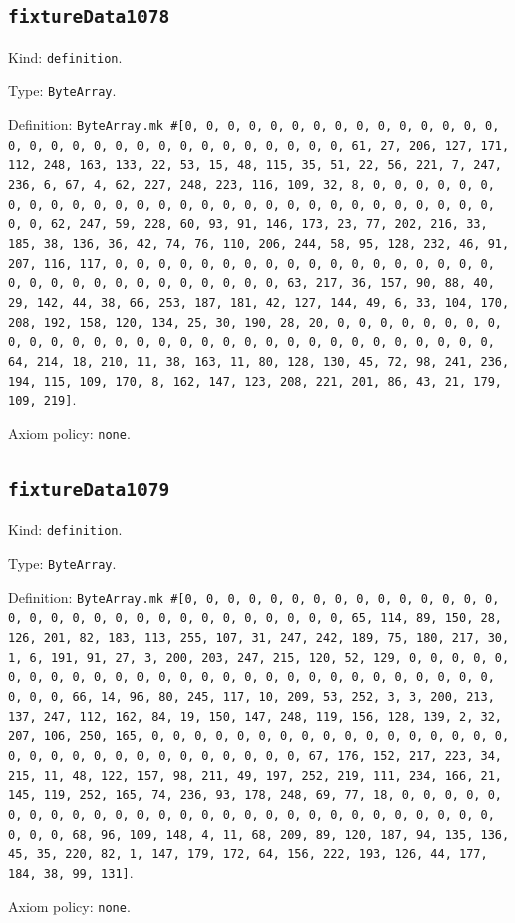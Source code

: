 \documentclass[11pt]{article}
\begin{document}
\subsection*{\texttt{fixtureData1078}}
\noindent Kind: \texttt{definition}.\par
\noindent Type: \texttt{ByteArray}.\par
\noindent Definition: \texttt{ByteArray.mk \#[0, 0, 0, 0, 0, 0, 0, 0, 0, 0, 0, 0, 0, 0, 0, 0, 0, 0, 0, 0, 0, 0, 0, 0, 0, 0, 0, 0, 0, 0, 0, 61, 27, 206, 127, 171, 112, 248, 163, 133, 22, 53, 15, 48, 115, 35, 51, 22, 56, 221, 7, 247, 236, 6, 67, 4, 62, 227, 248, 223, 116, 109, 32, 8, 0, 0, 0, 0, 0, 0, 0, 0, 0, 0, 0, 0, 0, 0, 0, 0, 0, 0, 0, 0, 0, 0, 0, 0, 0, 0, 0, 0, 0, 0, 0, 62, 247, 59, 228, 60, 93, 91, 146, 173, 23, 77, 202, 216, 33, 185, 38, 136, 36, 42, 74, 76, 110, 206, 244, 58, 95, 128, 232, 46, 91, 207, 116, 117, 0, 0, 0, 0, 0, 0, 0, 0, 0, 0, 0, 0, 0, 0, 0, 0, 0, 0, 0, 0, 0, 0, 0, 0, 0, 0, 0, 0, 0, 0, 0, 63, 217, 36, 157, 90, 88, 40, 29, 142, 44, 38, 66, 253, 187, 181, 42, 127, 144, 49, 6, 33, 104, 170, 208, 192, 158, 120, 134, 25, 30, 190, 28, 20, 0, 0, 0, 0, 0, 0, 0, 0, 0, 0, 0, 0, 0, 0, 0, 0, 0, 0, 0, 0, 0, 0, 0, 0, 0, 0, 0, 0, 0, 0, 0, 64, 214, 18, 210, 11, 38, 163, 11, 80, 128, 130, 45, 72, 98, 241, 236, 194, 115, 109, 170, 8, 162, 147, 123, 208, 221, 201, 86, 43, 21, 179, 109, 219]}.\par
\noindent Axiom policy: \texttt{none}.\par
\subsection*{\texttt{fixtureData1079}}
\noindent Kind: \texttt{definition}.\par
\noindent Type: \texttt{ByteArray}.\par
\noindent Definition: \texttt{ByteArray.mk \#[0, 0, 0, 0, 0, 0, 0, 0, 0, 0, 0, 0, 0, 0, 0, 0, 0, 0, 0, 0, 0, 0, 0, 0, 0, 0, 0, 0, 0, 0, 0, 65, 114, 89, 150, 28, 126, 201, 82, 183, 113, 255, 107, 31, 247, 242, 189, 75, 180, 217, 30, 1, 6, 191, 91, 27, 3, 200, 203, 247, 215, 120, 52, 129, 0, 0, 0, 0, 0, 0, 0, 0, 0, 0, 0, 0, 0, 0, 0, 0, 0, 0, 0, 0, 0, 0, 0, 0, 0, 0, 0, 0, 0, 0, 0, 66, 14, 96, 80, 245, 117, 10, 209, 53, 252, 3, 3, 200, 213, 137, 247, 112, 162, 84, 19, 150, 147, 248, 119, 156, 128, 139, 2, 32, 207, 106, 250, 165, 0, 0, 0, 0, 0, 0, 0, 0, 0, 0, 0, 0, 0, 0, 0, 0, 0, 0, 0, 0, 0, 0, 0, 0, 0, 0, 0, 0, 0, 0, 0, 67, 176, 152, 217, 223, 34, 215, 11, 48, 122, 157, 98, 211, 49, 197, 252, 219, 111, 234, 166, 21, 145, 119, 252, 165, 74, 236, 93, 178, 248, 69, 77, 18, 0, 0, 0, 0, 0, 0, 0, 0, 0, 0, 0, 0, 0, 0, 0, 0, 0, 0, 0, 0, 0, 0, 0, 0, 0, 0, 0, 0, 0, 0, 0, 68, 96, 109, 148, 4, 11, 68, 209, 89, 120, 187, 94, 135, 136, 45, 35, 220, 82, 1, 147, 179, 172, 64, 156, 222, 193, 126, 44, 177, 184, 38, 99, 131]}.\par
\noindent Axiom policy: \texttt{none}.\par
\end{document}
